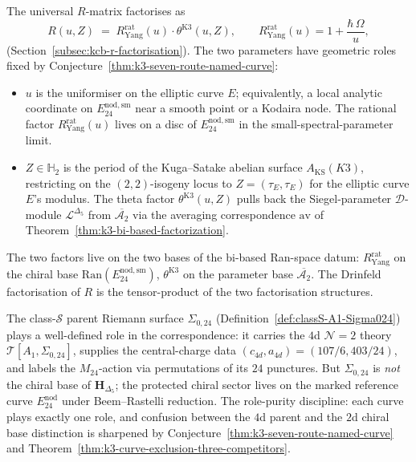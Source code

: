 \begin{remark}[Compatibility with the Drinfeld factorisation
\texorpdfstring{$R = R^{\mathrm{rat}}_{\mathrm{Yang}}\cdot\theta^{\mathrm{K3}}$}{R = R-rat-Yangcdottheta-K3}]
\label{rem:k3-drinfeld-factorization-curve-compat}
The universal $R$-matrix factorises as
\[
 R(u,Z)
 \;=\;
 R^{\mathrm{rat}}_{\mathrm{Yang}}(u)\cdot\theta^{\mathrm{K3}}(u,Z),
 \qquad
 R^{\mathrm{rat}}_{\mathrm{Yang}}(u)
 = 1 + \frac{\hbar\,\Omega}{u},
\]
(Section~\ref{subsec:kcb-r-factorisation}). The two parameters have
geometric roles fixed by
Conjecture~\ref{thm:k3-seven-route-named-curve}:
\begin{itemize}
\item $u$ is the uniformiser on the elliptic curve $E$; equivalently,
 a local analytic coordinate on $E^{\mathrm{nod,sm}}_{24}$ near a
 smooth point or a Kodaira node. The rational factor
 $R^{\mathrm{rat}}_{\mathrm{Yang}}(u)$ lives on a disc of
 $E^{\mathrm{nod,sm}}_{24}$ in the small-spectral-parameter limit.
\item $Z\in\mathbb{H}_2$ is the period of the Kuga--Satake abelian
 surface $A_{\mathrm{KS}}(K3)$, restricting on the $(2,2)$-isogeny
 locus to $Z = (\tau_E,\tau_E)$ for the elliptic curve $E$'s modulus.
 The theta factor $\theta^{\mathrm{K3}}(u,Z)$ pulls back the
 Siegel-parameter $\mathcal{D}$-module $\mathcal{L}^{\Delta_5}$ from
 $\overline{\mathcal{A}_2}$ via the averaging correspondence $\mathrm{av}$
 of Theorem~\ref{thm:k3-bi-based-factorization}.
\end{itemize}
The two factors live on the two bases of the bi-based Ran-space datum:
$R^{\mathrm{rat}}_{\mathrm{Yang}}$ on the chiral base
$\mathrm{Ran}(E^{\mathrm{nod,sm}}_{24})$, $\theta^{\mathrm{K3}}$ on the
parameter base $\overline{\mathcal{A}_2}$. The Drinfeld factorisation
of $R$ is the tensor-product of the two factorisation structures.
\end{remark}

\begin{remark}
\label{rem:k3-role-purity-sigma024}
The class-$\mathcal{S}$ parent Riemann surface $\Sigma_{0,24}$
(Definition~\ref{def:classS-A1-Sigma024}) plays a well-defined role
in the correspondence: it carries the $4$d $\mathcal{N}=2$ theory
$\mathcal{T}[A_1,\Sigma_{0,24}]$, supplies the central-charge data
$(c_{4d},a_{4d}) = (107/6, 403/24)$, and labels the $M_{24}$-action via
permutations of its $24$ punctures. But $\Sigma_{0,24}$ is \emph{not}
the chiral base of $\mathbf{H}_{\Delta_5}$; the protected chiral
sector lives on the marked reference curve $E^{\mathrm{nod}}_{24}$
under Beem--Rastelli reduction. The role-purity discipline: each curve
plays exactly one role, and confusion between the $4$d parent and the
$2$d chiral base distinction is sharpened by
Conjecture~\ref{thm:k3-seven-route-named-curve} and
Theorem~\ref{thm:k3-curve-exclusion-three-competitors}.
\end{remark}

